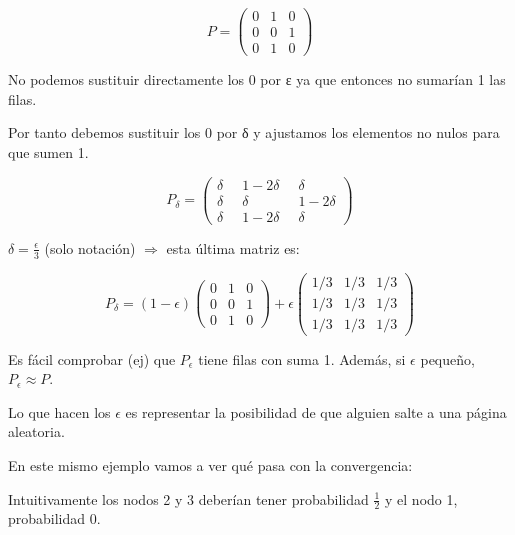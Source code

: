 \begin{example}

\begin{center}
\end{center}

	$$P = \left( \begin{array}{ccc}
0 & 1 & 0 \\
0 & 0 & 1 \\
0 & 1 & 0 \end{array} \right)$$

No podemos sustituir directamente los 0 por ε ya que entonces no sumarían 1 las filas.

Por tanto debemos sustituir los 0 por δ y ajustamos los elementos no nulos para que sumen 1.

$$P_{\delta} = \left( \begin{array}{ccc}
\delta & \;\; 1-2\delta \;\; & \delta \\
\delta & \;\; \delta \;\;& 1 - 2 \delta\\
\delta & \;\; 1 - 2 \delta \;\; & \delta \end{array} \right)$$



$\delta = \frac{\epsilon}{3}$ (solo notación) $\Rightarrow$ esta última matriz es:


$$P_{\delta}= (1-\epsilon)\left( \begin{array}{ccc}
0 & 1 & 0 \\
0 & 0 & 1 \\
0 & 1 & 0 \end{array} \right) + \epsilon \left( \begin{array}{ccc}
1/3 & 1/3 & 1/3 \\
1/3 & 1/3 & 1/3 \\
1/3 & 1/3 & 1/3 \end{array} \right)$$


Es fácil comprobar (ej) que $P_{\epsilon}$ tiene filas con suma 1. Además, si $\epsilon$ pequeño, $P_{\epsilon} ≈ P$.

Lo que hacen los $\epsilon$ es representar la posibilidad de que alguien salte a una página aleatoria.

\begin{center}
\end{center}


En este mismo ejemplo vamos a ver qué pasa con la convergencia:

Intuitivamente los nodos 2 y 3 deberían tener probabilidad $\frac{1}{2}$ y el nodo 1, probabilidad 0.


\end{example}
